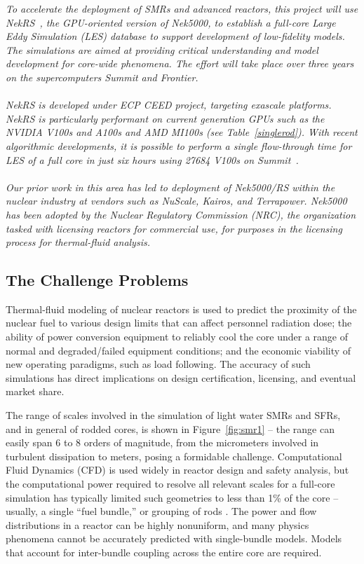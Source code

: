 \begin{displayquote}
{\it
To accelerate the deployment of SMRs and advanced reactors, this project will
use NekRS~\cite{nekrs}, the GPU-oriented version of Nek5000, to establish a full-core Large Eddy
Simulation (LES) database to support development of low-fidelity models.  
The simulations are aimed at providing critical understanding and model
development for core-wide phenomena.  The effort will take place over three
years on the supercomputers Summit and Frontier.\\
\\
\noindent NekRS is developed under ECP CEED project, targeting exascale platforms.
NekRS is particularly performant on current generation GPUs such as the NVIDIA
V100s and A100s and AMD MI100s (see Table~\ref{singlerod}).  
With recent algorithmic developments, it is possible
to perform a single flow-through time for LES of a full core in just six hours
using 27684 V100s on Summit~\cite{peb21}.\\
\\
Our prior work in this area has led to deployment of Nek5000/RS within the
nuclear industry at vendors such as NuScale, Kairos, and Terrapower.
Nek5000 has been adopted by the Nuclear Regulatory Commission (NRC), the
organization tasked with licensing reactors for commercial use,
for purposes in the licensing process for thermal-fluid analysis.
}
\end{displayquote}

\vspace{-.25in} \subsection{The Challenge Problems}
\vspace{-.2in}

Thermal-fluid modeling of nuclear reactors is used to predict the
proximity of the nuclear fuel to various design limits that can affect
personnel radiation dose; the ability of power conversion equipment to reliably
cool the core under a range of normal and degraded/failed equipment conditions;
and the economic viability of new operating paradigms, such as load following.
The accuracy of such simulations has direct implications on design
certification, licensing, and eventual market share.

The range of scales involved in the simulation of light water SMRs and SFRs, and in general of rodded cores, is shown in Figure~\ref{fig:smr1} -- the range can easily span 6 to 8 orders of magnitude, from the micrometers involved in turbulent dissipation to meters, posing a formidable challenge.
Computational Fluid Dynamics (CFD) is used widely in reactor design and safety
analysis, but the computational power required to resolve all relevant scales for a full-core simulation has typically limited
such geometries to less than 1\% of the core -- usually, a single ``fuel
bundle,'' or grouping of rods \cite{wang2020,fanning,wang2020b}.
The power and flow distributions in a reactor can be highly nonuniform, and many physics
phenomena cannot be accurately predicted with single-bundle models. Models that
account for inter-bundle coupling across the entire core are required.

